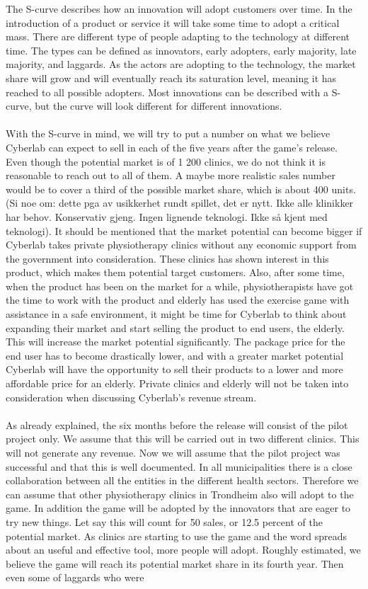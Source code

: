 The S-curve describes how an innovation will adopt customers over time. In the introduction of a product or service it will take some time to adopt a critical mass. There are different type of people adapting to the technology at different time. The types can be defined as innovators, early adopters, early majority, late majority, and laggards. As the actors are adopting to the technology, the market share will grow and will eventually reach its saturation level, meaning it has reached to all possible adopters. Most innovations can be described with a S-curve, but the curve will look different for different innovations.\cite{scurve}\\ \\
With the S-curve in mind, we will try to put a number on what we believe Cyberlab can expect to sell in each of the five years after the game’s release. Even though the potential market is of 1 200 clinics, we do not think it is reasonable to reach out to all of them. A maybe more realistic sales number would be to cover a third of the possible market share, which is about 400 units. (Si noe om: dette pga av usikkerhet rundt spillet, det er nytt. Ikke alle klinikker har behov. Konservativ gjeng. Ingen lignende teknologi. Ikke s{å} kjent med teknologi). It should be mentioned that the market potential can become bigger if Cyberlab takes private physiotherapy clinics without any economic support from the government into consideration. These clinics has shown interest in this product, which makes them potential target customers. Also, after some time, when the product has been on the market for a while, physiotherapists have got the time to work with the product and elderly has used the exercise game with assistance in a safe environment, it might be time for Cyberlab to think about expanding their market and start selling the product to end users, the elderly. This will increase the market potential significantly. The package price for the end user has to become drastically lower, and with a greater market potential Cyberlab will have the opportunity to sell their products to a lower and more affordable price for an elderly. Private clinics and elderly will not be taken into consideration when discussing Cyberlab's revenue stream.\\ \\ As already explained, the six months before the release will consist of the pilot project only. We assume that this will be carried out in two different clinics. This will not generate any revenue. Now we will assume that the pilot project was successful and that this is well documented. In all municipalities there is a close collaboration between all the entities in the different health sectors. Therefore we can assume that other physiotherapy clinics in Trondheim also will adopt to the game. In addition the game will be adopted by the innovators that are eager to try new things. Let say this will count for 50 sales, or 12.5 percent of the potential market. As clinics are starting to use the game and the word spreads about an useful and effective tool, more people will adopt. Roughly estimated, we believe the game will reach its potential market share in its fourth year. Then even some of laggards who were 